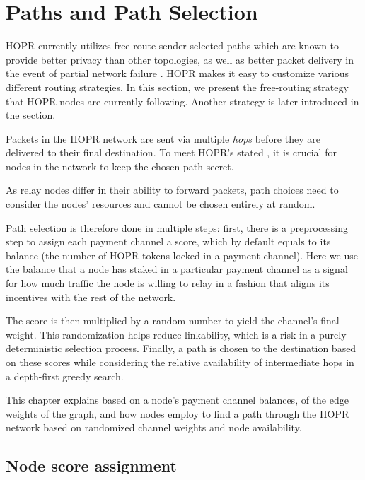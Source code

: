 \section{Paths and Path Selection}
\label{sec:path-selection}
HOPR currently utilizes free-route sender-selected paths which are known to provide better privacy than other topologies, as well as better packet delivery in the event of partial network failure \cite{Dingledine2004SynchronousBF}. HOPR makes it easy to customize various different routing strategies. In this section, we present the free-routing strategy that HOPR nodes are currently following. Another strategy is later introduced in the  section.

Packets in the HOPR network are sent via multiple \textit{hops} before they are delivered to their final destination. To meet HOPR's stated , it is crucial for nodes in the network to keep the chosen path secret.

As relay nodes differ in their ability to forward packets, path choices need to consider the nodes' resources and cannot be chosen entirely at random.

Path selection is therefore done in multiple steps: first, there is a preprocessing step to assign each payment channel a score, which by default equals to its balance (the number of HOPR tokens locked in a payment channel). Here we use the balance that a node has staked in a particular payment channel as a signal for how much traffic the node is willing to relay in a fashion that aligns its incentives with the rest of the network.

The score is then multiplied by a random number to yield the channel's final weight. This randomization helps reduce linkability, which is a risk in a purely deterministic selection process. Finally, a path is chosen to the destination based on these scores while considering the relative availability of intermediate hops in a depth-first greedy search.

This chapter explains  based on a node's payment channel balances,  of the edge weights of the graph, and how nodes employ  to find a path through the HOPR network based on randomized channel weights and node availability.

\subsection{Node score assignment}
\label{sec:path-selection:node-score}

